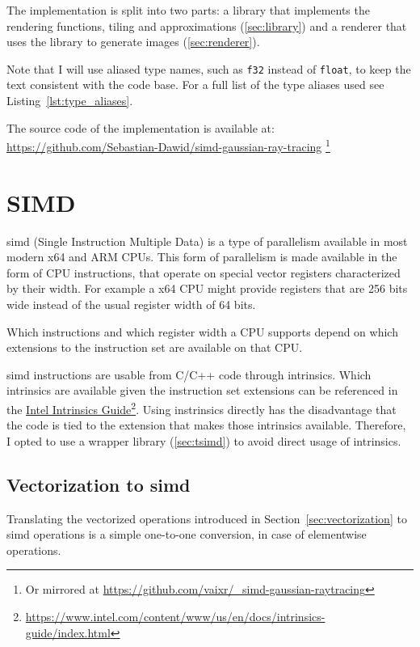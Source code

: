 \documentclass[a4paper, 11pt]{memoir}
\begin{document}
    The implementation is split into two parts: a library that implements the rendering functions, tiling and approximations
    (\ref{sec:library}) and a renderer that uses the library to generate images (\ref{sec:renderer}).

    Note that I will use aliased type names, such as \texttt{f32} instead of \texttt{float}, to keep the
    text consistent with the code base. For a full list of the type aliases used see Listing~\ref{lst:type_aliases}.

    The source code of the implementation is available at: \\
    \href{https://github.com/Sebastian-Dawid/simd-gaussian-ray-tracing}{https://github.com/Sebastian-Dawid/simd-gaussian-ray-tracing}
    \footnote{Or mirrored at \href{https://github.com/vaixr/_simd-gaussian-raytracing}{https://github.com/vaixr/\_simd-gaussian-raytracing}}

    \section{SIMD}
    \label{sec:simd}
    \gls{simd} (Single Instruction Multiple Data) is a type of parallelism available in most modern x64 and ARM CPUs. This
    form of parallelism is made available in the form of CPU instructions, that operate on special vector registers
    characterized by their width. For example a x64 CPU might provide registers that are 256 bits wide instead of
    the usual register width of 64 bits.

    Which instructions and which register width a CPU supports depend on which extensions to the instruction set are
    available on that CPU.

    \gls{simd} instructions are usable from C/C++ code through intrinsics. Which intrinsics are available given the
    instruction set extensions can be referenced in the
    \href{https://www.intel.com/content/www/us/en/docs/intrinsics-guide/index.html}{Intel Intrinsics
    Guide}\footnote{\href{https://www.intel.com/content/www/us/en/docs/intrinsics-guide/index.html}{https://www.intel.com/content/www/us/en/docs/intrinsics-guide/index.html}}.
    Using instrinsics directly has the disadvantage that the code is tied to the extension that makes those intrinsics
    available. Therefore, I opted to use a wrapper library (\ref{sec:tsimd}) to avoid direct usage of intrinsics.

    \subsection{Vectorization to \gls{simd}}
    \label{sec:vectorization_to_simd}
    Translating the vectorized operations introduced in Section~\ref{sec:vectorization} to
    \gls{simd} operations is a simple one-to-one conversion, in case of elementwise operations.
\end{document}
